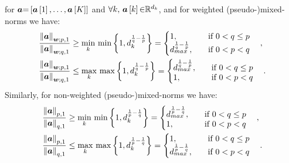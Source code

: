 \begin{property}
\label{lm:FractionBound} %
 for $\boldsymbol{a} {=} \left[ \boldsymbol{a}\left[ 1 \right],\ldots,\boldsymbol{a}\left[ K \right] \right]$ and $\forall k ,\, \boldsymbol{a}\left[ k \right] {\in} \mathbb{R}^{d_k}$, and for weighted (pseudo-)mixed-norms we have: %
\begin{gather*}
\begin{aligned}
&\frac{\left\lVert\boldsymbol{a}\right\rVert_{\boldsymbol{w};p,1}}{\left\lVert\boldsymbol{a}\right\rVert_{\boldsymbol{w};q,1}} \geq
\min_k \, \min \left\lbrace 1 , d_k^{\frac1q - \frac1p} \right\rbrace = 
\begin{cases}
\begin{aligned}
  &1, \quad &&\text{if } 0 < q \leq p \\
  &d_{max}^{\frac1q - \frac1p}, \quad &&\text{if } 0 < p < q
\end{aligned}
\end{cases}, \\
&\frac{\left\lVert\boldsymbol{a}\right\rVert_{\boldsymbol{w};p,1}}{\left\lVert\boldsymbol{a}\right\rVert_{\boldsymbol{w};q,1}} \leq
\max_k \, \max \left\lbrace 1 , d_k^{\frac1q - \frac1p} \right\rbrace = 
\begin{cases}
\begin{aligned}
  &d_{max}^{\frac1q - \frac1p}, \quad &&\text{if } 0 < q \leq p \\
  &1, \quad &&\text{if } 0 < p < q
\end{aligned}
\end{cases}.
\end{aligned}
\end{gather*}
Similarly, for non-weighted (pseudo-)mixed-norms we have: %
\begin{gather*}
\begin{aligned}
&\frac{\left\lVert\boldsymbol{a}\right\rVert_{p,1}}{\left\lVert\boldsymbol{a}\right\rVert_{q,1}} \geq
\min_k \, \min \left\lbrace 1 , d_k^{\frac1p - \frac1q} \right\rbrace = 
\begin{cases}
\begin{aligned}
  &d_{max}^{\frac1p - \frac1q}, \quad &&\text{if } 0 < q \leq p \\
  &1, \quad &&\text{if } 0 < p < q
\end{aligned}
\end{cases}, \\
&\frac{\left\lVert\boldsymbol{a}\right\rVert_{p,1}}{\left\lVert\boldsymbol{a}\right\rVert_{q,1}} \leq
\max_k \, \max \left\lbrace 1 , d_k^{\frac1p - \frac1q} \right\rbrace = 
\begin{cases}
\begin{aligned}
  &1, \quad &&\text{if } 0 < q \leq p \\
  &d_{max}^{\frac1p - \frac1q}, \quad &&\text{if } 0 < p < q
\end{aligned}
\end{cases}.
\end{aligned}
\end{gather*}
\end{property}
